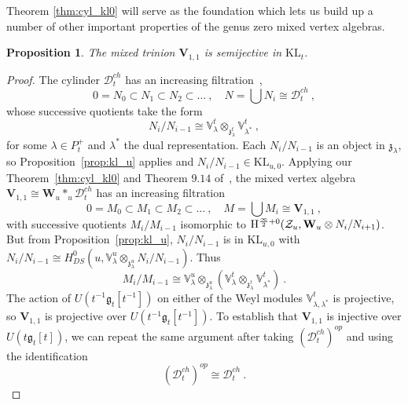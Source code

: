 \documentclass[a4paper]{article}
\newtheorem{prop}[thm]{Proposition}
\def\IV{\mathbb{V}}
\def\ZZ{{\cal Z}}
\def\gf{\mathfrak{g}}
\def \zf{\mathfrak{z}}
\def \KL{\mathrm{KL}}
\newcommand{\Hi}[1]{\mathrm{H}^{\frac{\infty}{2}+#1}}
\def\D{\mathcal{D}^{ch}}
\def\W{\mathbf{W}}
\def\V{\mathbf{V}}
\begin{document}
Theorem \ref{thm:cyl_kl0} will serve as the foundation which lets us build up a number of other important properties of the genus zero mixed vertex algebras.
\begin{prop}\label{prop:trin_free_cofree}
The mixed trinion $\V_{1,1}$ is semijective in $\KL_t$.
\end{prop}
\begin{proof}
The cylinder $\D_t$ has an increasing filtration~\cite{frenkel2004},
\begin{equation*}
	0=N_0\subset N_1\subset N_2 \subset \dots ~,\quad N = \bigcup N_i \cong \D_t~,
\end{equation*}
whose successive quotients take the form
\begin{equation*}
	N_{i}/N_{i-1} \cong \IV_\lambda^t\otimes_{\zf^t_\lambda}\IV_{\lambda^*}^t~,
\end{equation*}
for some $\lambda\in P_t^+$ and $\lambda^*$ the dual representation. Each $N_i/N_{i-1}$ is an object in $\zf_{\lambda}$, so Proposition~\ref{prop:kl_u} applies and $N_i/N_{i-1}\in\KL_{u,0}$. Applying our Theorem~\ref{thm:cyl_kl0} and Theorem $9.14$ of~\cite{Arakawa:2018egx}, the mixed vertex algebra $\V_{1,1} \cong \W_u\ast_u \D_t$ has an increasing filtration
\begin{equation*}
	0= M_0\subset M_1 \subset M_2 \subset \dots ~,\quad M = \bigcup M_i \cong \V_{1,1}~,
\end{equation*}
with successive quotients $M_i/M_{i-1}$ isomorphic to $\Hi{0}(\ZZ_u,\W_u\otimes N_{i}/N_{i+1})$. But from Proposition~\ref{prop:kl_u}, $N_i/N_{i-1}$ is in $\KL_{u,0}$ with $N_i/N_{i-1}\cong H^0_{DS}(u,\IV^u_\lambda\otimes_{\zf^u_{\lambda}}N_{i}/N_{i-1})$. Thus
\begin{equation*}
	M_i/M_{i-1} \cong \IV_\lambda^u \otimes_{\zf^u_\lambda} \left( \IV^t_\lambda\otimes_{\zf^t_\lambda}\IV_{\lambda^*}^t \right)~.
\end{equation*}
The action of $U(t^{-1}\gf_t[t^{-1}])$ on either of the Weyl modules $\IV^t_{\lambda,\lambda^*}$ is projective, so $\V_{1,1}$ is projective over $U(t^{-1}\gf_t[t^{-1}])$. To establish that $\V_{1,1}$ is injective over $U(t\gf_t[t])$, we can repeat the same argument after taking $(\D_t)^{op}$ and using the identification
\begin{equation*}
	(\D_t)^{op}\cong \D_t~.
\end{equation*}
\end{proof}
\vspace{-6pt}
\end{document}
